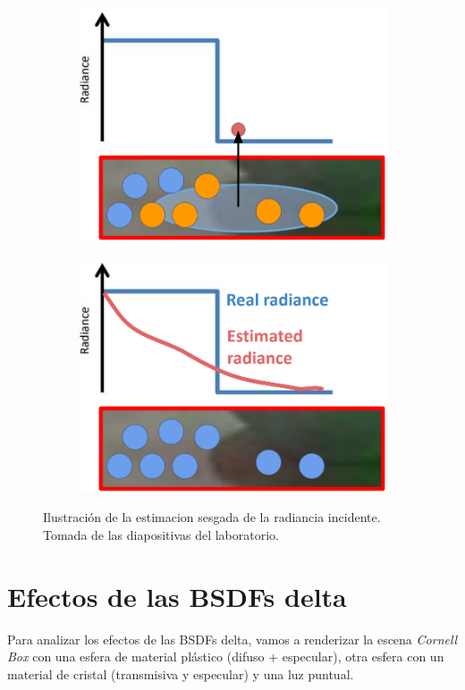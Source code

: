 \documentclass{article}
\begin{document}
\begin{figure}
\begin{subfigure}[h]{0.4\linewidth}
\includegraphics[width=\linewidth]{imgs/rad1.png}
\end{subfigure}
\hfill
\begin{subfigure}[h]{0.4\linewidth}
\includegraphics[width=\linewidth]{imgs/rad2.png}
\end{subfigure}
\caption{Ilustración de la estimacion sesgada de la radiancia incidente. Tomada de las diapositivas del laboratorio.}
\end{figure}

\section{Efectos de las BSDFs delta}
Para analizar los efectos de las BSDFs delta, vamos a renderizar la escena
\textit{Cornell Box} con una esfera de material plástico (difuso + especular),
otra esfera con un material de cristal (transmisiva y especular) y una luz
puntual.
\end{document}
